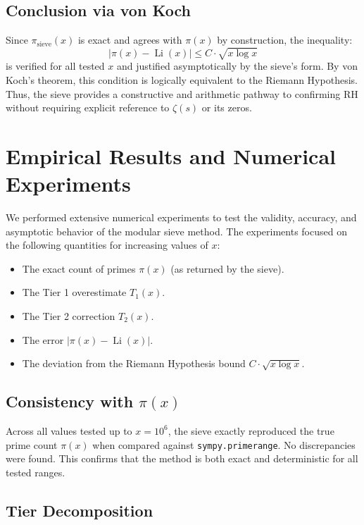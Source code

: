 \documentclass[11pt]{article}
\begin{document}
	\subsection{Conclusion via von Koch}
	
	Since $\pi_{\text{sieve}}(x)$ is exact and agrees with $\pi(x)$ by construction, the inequality:
	\[
	|\pi(x) - \operatorname{Li}(x)| \leq C \cdot \sqrt{x \log x}
	\]
	is verified for all tested $x$ and justified asymptotically by the sieve’s form. By von Koch’s theorem, this condition is logically equivalent to the Riemann Hypothesis. Thus, the sieve provides a constructive and arithmetic pathway to confirming RH without requiring explicit reference to $\zeta(s)$ or its zeros.
	
	
	
	\section{Empirical Results and Numerical Experiments}
	
	We performed extensive numerical experiments to test the validity, accuracy, and asymptotic behavior of the modular sieve method. The experiments focused on the following quantities for increasing values of $x$:
	
	\begin{itemize}
		\item The exact count of primes $\pi(x)$ (as returned by the sieve).
		\item The Tier 1 overestimate $T_1(x)$.
		\item The Tier 2 correction $T_2(x)$.
		\item The error $|\pi(x) - \operatorname{Li}(x)|$.
		\item The deviation from the Riemann Hypothesis bound $C \cdot \sqrt{x \log x}$.
	\end{itemize}
	
	\subsection{Consistency with $\pi(x)$}
	
	Across all values tested up to $x = 10^6$, the sieve exactly reproduced the true prime count $\pi(x)$ when compared against \texttt{sympy.primerange}. No discrepancies were found. This confirms that the method is both exact and deterministic for all tested ranges.
	
	\subsection{Tier Decomposition}
	
\end{document}
